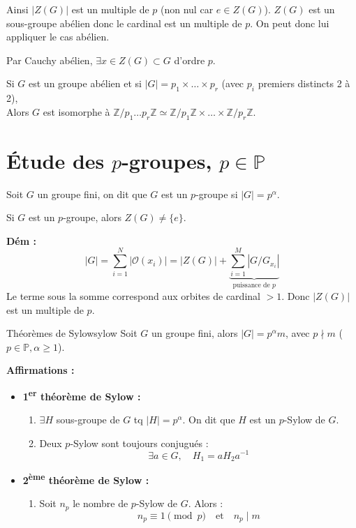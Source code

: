 Ainsi $|Z(G)|$ est un multiple de $p$ (non nul car $e \in Z(G)$).
$Z(G)$ est un sous-groupe abélien donc le cardinal est un multiple de $p$. On peut donc lui appliquer le cas abélien.

\noindent Par Cauchy abélien, $\exists x \in Z(G) \subset G$ d'ordre $p$. \hfill \faStop

\vspace{0.5cm}

\begin{exemple}
Si $G$ est un groupe abélien et si $|G| = p_1 \times \dots \times p_r$ (avec $p_i$ premiers distincts 2 à 2),\\
Alors $G$ est isomorphe à $\mathbb{Z}/p_1 \dots p_r \mathbb{Z} \simeq \mathbb{Z}/p_1\mathbb{Z} \times \dots \times \mathbb{Z}/p_r\mathbb{Z}$.
\end{exemple}

\section*{Étude des $p$-groupes, $p \in \mathbb{P}$}

Soit $G$ un groupe fini, on dit que $G$ est un $p$-groupe si $|G| = p^\alpha$.

\begin{theorement}
Si $G$ est un $p$-groupe, alors $Z(G) \neq \{e\}$.
\end{theorement}

\textbf{Dém :}
\[ |G| = \sum_{i=1}^N |\mathcal{O}(x_i)| = |Z(G)| + \underbrace{\sum_{i=1}^M |G/G_{x_i}|}_{\text{puissance de } p} \]
Le terme sous la somme correspond aux orbites de cardinal $> 1$.
Donc $|Z(G)|$ est un multiple de $p$. \hfill \faStop

\vspace{0.5cm}

\begin{theoreme}{Théorèmes de Sylow}{sylow}
Soit $G$ un groupe fini, alors $|G| = p^\alpha m$, avec $p \nmid m$ ($p \in \mathbb{P}, \alpha \geqslant 1$).

\textbf{Affirmations :}
\begin{itemize}
    \item \textbf{1\textsuperscript{er} théorème de Sylow :}
    \begin{enumerate}
        \item[(1)] $\exists H$ sous-groupe de $G$ tq $|H| = p^\alpha$. On dit que $H$ est un $p$-Sylow de $G$.
        \item[(2)] Deux $p$-Sylow sont toujours conjugués :
        \[ \exists a \in G, \quad H_1 = a H_2 a^{-1} \]
    \end{enumerate}
    
    \item \textbf{2\textsuperscript{ème} théorème de Sylow :}
    \begin{enumerate}
        \item[(3)] Soit $n_p$ le nombre de $p$-Sylow de $G$. Alors :
        \[ n_p \equiv 1 \pmod p \quad \text{et} \quad n_p \mid m \]
    \end{enumerate}
\end{itemize}
\end{theoreme}

